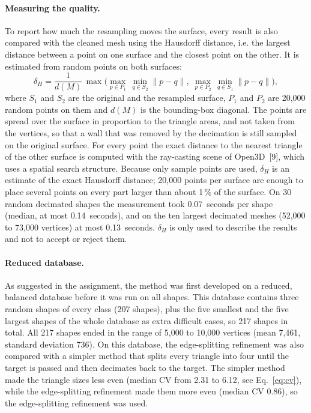 \documentclass[10pt,a4paper]{article}
\begin{document}
\paragraph{Measuring the quality.} To report how much the resampling moves the surface, every result is also compared with the
cleaned mesh using the Hausdorff distance, i.e. the largest distance between a point on one surface and the closest point on
the other. It is estimated from random points on both surfaces:
\begin{equation}
  \delta_H = \frac{1}{d(M)}\,\max\Big(\max_{p\in P_1}\,\min_{q\in S_2}\lVert p-q\rVert,\;\max_{p\in P_2}\,\min_{q\in S_1}\lVert p-q\rVert\Big),
  \label{eq:hausdorff}
\end{equation}
where $S_1$ and $S_2$ are the original and the resampled surface, $P_1$ and $P_2$ are 20,000 random points on them and $d(M)$ is
the bounding-box diagonal. The points are spread over the surface in proportion to the triangle areas, and not taken from the
vertices, so that a wall that was removed by the decimation is still sampled on the original surface. For every point the exact
distance to the nearest triangle of the other surface is computed with the ray-casting scene of Open3D~[9], which uses a
spatial search structure. Because only sample points are used, $\delta_H$ is an estimate of the exact Hausdorff distance;
20,000 points per surface are enough to place several points on every part larger than about 1\,\% of the surface. On 30
random decimated shapes the measurement took 0.07~seconds per shape (median, at most 0.14~seconds), and on the ten largest
decimated meshes (52,000 to 73,000 vertices) at most 0.13~seconds. $\delta_H$ is only used to describe the results and not to accept or reject them.

\paragraph{Reduced database.} As suggested in the assignment, the method was first developed on a reduced, balanced database
before it was run on all shapes. This database contains three random shapes of every class (207 shapes), plus the five smallest
and the five largest shapes of the whole database as extra difficult cases, so 217 shapes in total. All 217 shapes ended in the
range of 5,000 to 10,000 vertices (mean 7,461, standard deviation 736). On this database, the edge-splitting refinement was also
compared with a simpler method that splits every triangle into four until the target is passed and then decimates back to the
target. The simpler method made the triangle sizes less even (median CV from 2.31 to 6.12, see Eq.~\eqref{eq:cv}), while the
edge-splitting refinement made them more even (median CV 0.86), so the edge-splitting refinement was used.
\end{document}
